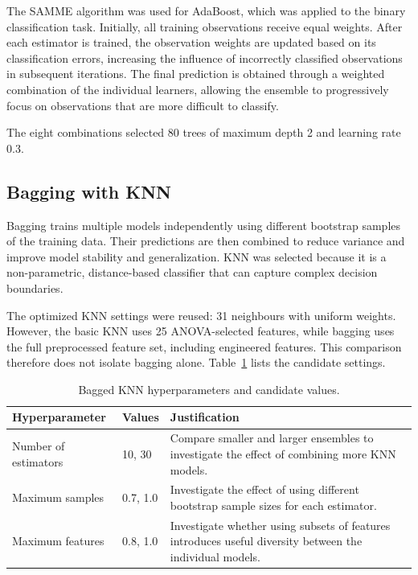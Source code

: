 The SAMME algorithm was used for AdaBoost, which was applied to the binary classification task. Initially, all training observations receive equal weights. After each estimator is trained, the observation weights are updated based on its classification errors, increasing the influence of incorrectly classified observations in subsequent iterations. The final prediction is obtained through a weighted combination of the individual learners, allowing the ensemble to progressively focus on observations that are more difficult to classify.

The eight combinations selected 80 trees of maximum depth 2 and learning rate
0.3.

\subsection{Bagging with KNN}

Bagging trains multiple models independently using different bootstrap samples of the training data. Their predictions are then combined to reduce variance and improve model stability and generalization. KNN was selected because it is a non-parametric, distance-based classifier that can capture complex decision boundaries.

The optimized KNN settings were reused: 31 neighbours with uniform weights.
However, the basic KNN uses 25 ANOVA-selected features, while bagging uses the
full preprocessed feature set, including engineered features. This comparison
therefore does not isolate bagging alone.
Table~\ref{tab:bagged-knn-hyperparameters} lists the candidate settings.

\begin{table}[H]
    \centering
    \caption[Bagged KNN tuning grid]{Bagged KNN hyperparameters and candidate values.}
    \label{tab:bagged-knn-hyperparameters}
    \begin{tabularx}{\linewidth}{@{}l l X@{}}
        \hline
        \textbf{Hyperparameter} & \textbf{Values} & \textbf{Justification} \\
        \hline
        Number of estimators & 10, 30 &
        Compare smaller and larger ensembles to investigate the effect of combining more KNN models. \\

        Maximum samples & 0.7, 1.0 &
        Investigate the effect of using different bootstrap sample sizes for each estimator. \\

        Maximum features & 0.8, 1.0 &
        Investigate whether using subsets of features introduces useful diversity between the individual models. \\
        \hline
    \end{tabularx}
\end{table}

